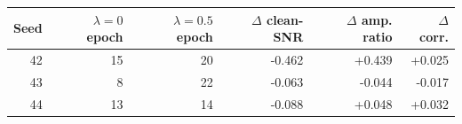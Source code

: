 \begin{tabular}{rrrrrr}
\toprule
Seed & $\lambda=0$ epoch & $\lambda=0.5$ epoch & $\Delta$ clean-SNR & $\Delta$ amp. ratio & $\Delta$ corr. \\
\midrule
42 & 15 & 20 & -0.462 & +0.439 & +0.025 \\
43 & 8 & 22 & -0.063 & -0.044 & -0.017 \\
44 & 13 & 14 & -0.088 & +0.048 & +0.032 \\
\bottomrule
\end{tabular}
